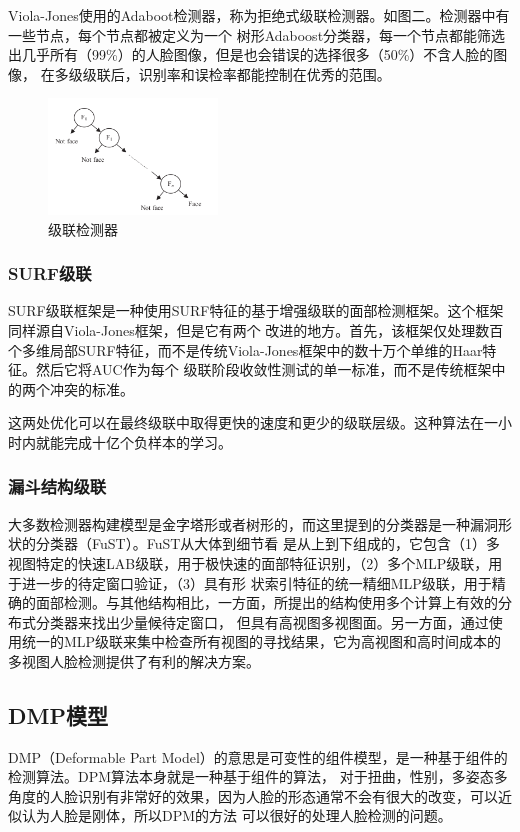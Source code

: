 \documentclass[UTF8]{ctexart}
\begin{document}
Viola-Jones使用的Adaboot检测器，称为拒绝式级联检测器。如图二。检测器中有一些节点，每个节点都被定义为一个
树形Adaboost分类器，每一个节点都能筛选出几乎所有（99\%）的人脸图像，但是也会错误的选择很多（50\%）不含人脸的图像，
在多级级联后，识别率和误检率都能控制在优秀的范围。\cite{cuimei2017human}

\begin{figure}[H]
   \centering
   \includegraphics[width=0.4\textwidth]{img/cascade.png}
   \caption{级联检测器} 
\end{figure}
\subsubsection{SURF级联}
SURF级联框架是一种使用SURF特征的基于增强级联的面部检测框架\cite{li2011face}。这个框架同样源自Viola-Jones框架，但是它有两个
改进的地方。首先，该框架仅处理数百个多维局部SURF特征，而不是传统Viola-Jones框架中的数十万个单维的Haar特征。然后它将AUC作为每个
级联阶段收敛性测试的单一标准，而不是传统框架中的两个冲突的标准。

这两处优化可以在最终级联中取得更快的速度和更少的级联层级。这种算法在一小时内就能完成十亿个负样本的学习。
\subsubsection{漏斗结构级联}
大多数检测器构建模型是金字塔形或者树形的，而这里提到的分类器是一种漏洞形状的分类器（FuST）。FuST\cite{wu2017funnel}从大体到细节看
是从上到下组成的，它包含（1）多视图特定的快速LAB级联，用于极快速的面部特征识别，（2）多个MLP级联，用于进一步的待定窗口验证，（3）具有形
状索引特征的统一精细MLP级联，用于精确的面部检测。与其他结构相比，一方面，所提出的结构使用多个计算上有效的分布式分类器来找出少量候待定窗口，
但具有高视图多视图面。另一方面，通过使用统一的MLP级联来集中检查所有视图的寻找结果，它为高视图和高时间成本的多视图人脸检测提供了有利的解决方案。


\subsection{DMP模型}
DMP（Deformable Part Model）的意思是可变性的组件模型，是一种基于组件的检测算法。DPM算法本身就是一种基于组件的算法，
对于扭曲，性别，多姿态多角度的人脸识别有非常好的效果，因为人脸的形态通常不会有很大的改变，可以近似认为人脸是刚体，所以DPM的方法
可以很好的处理人脸检测的问题。
\end{document}
